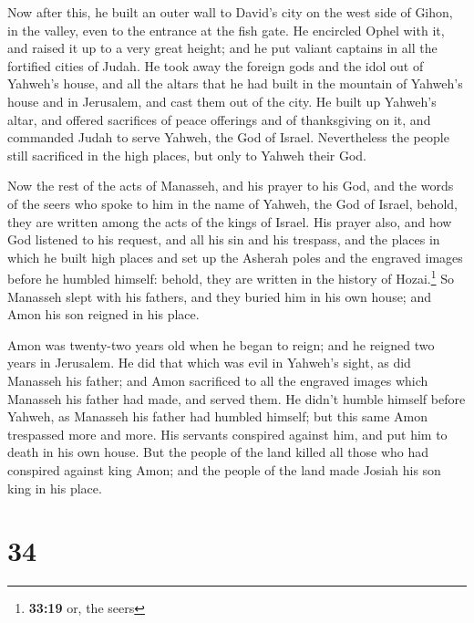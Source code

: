  Now after this, he built an outer wall to David's city
on the west side of Gihon, in the valley, even to the entrance at the
fish gate. He encircled Ophel with it, and raised it up to a very great
height; and he put valiant captains in all the fortified cities of
Judah.  He took away the foreign gods and the idol out of
Yahweh's house, and all the altars that he had built in the mountain of
Yahweh's house and in Jerusalem, and cast them out of the city.
 He built up Yahweh's altar, and offered sacrifices of
peace offerings and of thanksgiving on it, and commanded Judah to serve
Yahweh, the God of Israel.  Nevertheless the people still
sacrificed in the high places, but only to Yahweh their God.

 Now the rest of the acts of Manasseh, and his prayer to
his God, and the words of the seers who spoke to him in the name of
Yahweh, the God of Israel, behold, they are written among the acts of
the kings of Israel.  His prayer also, and how God
listened to his request, and all his sin and his trespass, and the
places in which he built high places and set up the Asherah poles and
the engraved images before he humbled himself: behold, they are written
in the history of Hozai.\footnote{\textbf{33:19} or, the seers}
 So Manasseh slept with his fathers, and they buried him
in his own house; and Amon his son reigned in his place.

 Amon was twenty-two years old when he began to reign;
and he reigned two years in Jerusalem.  He did that which
was evil in Yahweh's sight, as did Manasseh his father; and Amon
sacrificed to all the engraved images which Manasseh his father had
made, and served them.  He didn't humble himself before
Yahweh, as Manasseh his father had humbled himself; but this same Amon
trespassed more and more.  His servants conspired against
him, and put him to death in his own house.  But the
people of the land killed all those who had conspired against king Amon;
and the people of the land made Josiah his son king in his place.

\hypertarget{section-33}{%
\section{34}\label{section-33}}

